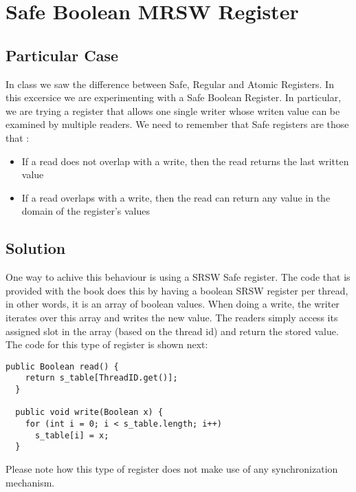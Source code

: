 \section{\textbf{Safe Boolean MRSW Register}}
\subsection{Particular Case}
\par
In class we saw the difference between Safe, Regular and Atomic Registers. In
this excersice we are experimenting with a Safe Boolean Register. In particular,
we are trying a register that allows one single writer whose writen value can be
examined by multiple readers. We need to remember that Safe registers are those
that :
\begin{itemize}
\item If a read does not overlap with a write, then the read returns the last
written value
\item If a read overlaps with a write, then the read can return any value in the
domain of the register's values
\end{itemize}
\subsection{Solution}
\par
One way to achive this behaviour is using a SRSW Safe register. The code that is
provided with the book does this by having a boolean SRSW register per thread,
in other words, it is an array of boolean values. When doing a write, the writer
iterates over this array and writes the new value. The readers simply access its
assigned slot in the array (based on the thread id) and return the stored
value. The code for this type of register is shown next:
\par
\begin{lstlisting}[style=numbers]
  public Boolean read() {
    return s_table[ThreadID.get()];
  }

  public void write(Boolean x) {
    for (int i = 0; i < s_table.length; i++)
      s_table[i] = x;
  }
\end{lstlisting}
\hfill
\par
Please note how this type of register does not make use of any synchronization
mechanism.

